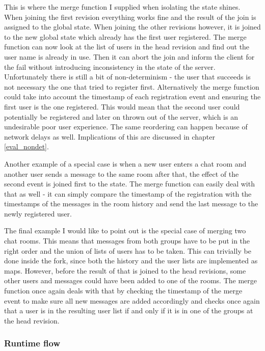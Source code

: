 \documentclass[12pt,twoside,notitlepage]{report}
\begin{document}
{This is where the merge function I supplied when isolating the state shines. When joining the first revision everything works fine and the result of the join is assigned to the global state. When joining the other revisions however, it is joined to the new global state which already has the first user registered. The merge function can now look at the list of users in the head revision and find out the user name is already in use. Then it can abort the join and inform the client for the fail without introducing inconsistency in the state of the server. Unfortunately there is still a bit of non-determinism - the user that succeeds is not necessary the one that tried to register first. Alternatively the merge function could take into account the timestamp of each registration event and ensuring the first user is the one registered. This would mean that the second user could potentially be registered and later on thrown out of the server, which is an undesirable poor user experience. The same reordering can happen because of network delays as well. Implications of this are discussed in chapter \ref{eval_nondet}.

Another example of a special case is when a new user enters a chat room and another user sends a message to the same room after that, the effect of the second event is joined first to the state. The merge function can easily deal with that as well - it can simply compare the timestamp of the registration with the timestamps of the messages in the room history and send the last message to the newly registered user.

The final example I would like to point out is the special case of merging two chat rooms. This means that messages from both groups have to be put in the right order and the union of lists of users has to be taken. This can trivially be done inside the fork, since both the history and the user lists are implemented as maps. However, before the result of that is joined to the head revisions, some other users and messages could have been added to one of the rooms. The merge function once again deals with that by checking the timestamp of the merge event to make sure all new messages are added accordingly and checks once again that a user is in the resulting user list if and only if it is in one of the groups at the head revision.

\subsubsection{Runtime flow}

}
\end{document}
